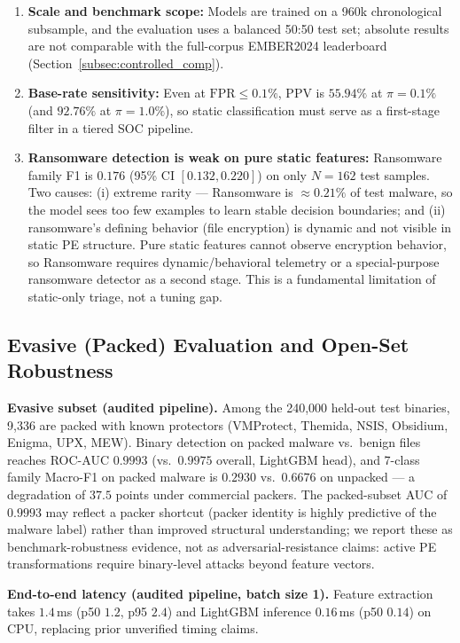 \documentclass[Number]{sn-jnl}
\begin{document}
\begin{enumerate}[leftmargin=*]
\item \textbf{Scale and benchmark scope:} Models are trained on a 960k chronological subsample, and the evaluation uses a balanced 50:50 test set; absolute results are not comparable with the full-corpus EMBER2024 leaderboard (Section~\ref{subsec:controlled_comp}).

\item \textbf{Base-rate sensitivity:} Even at $\text{FPR}\le0.1\%$, PPV is $55.94\%$ at $\pi=0.1\%$ (and $92.76\%$ at $\pi=1.0\%$), so static classification must serve as a first-stage filter in a tiered SOC pipeline.

\item \textbf{Ransomware detection is weak on pure static features:} Ransomware family F1 is $0.176$ (95\% CI $[0.132, 0.220]$) on only $N=162$ test samples. Two causes: (i) extreme rarity --- Ransomware is $\approx0.21\%$ of test malware, so the model sees too few examples to learn stable decision boundaries; and (ii) ransomware's defining behavior (file encryption) is dynamic and not visible in static PE structure. Pure static features cannot observe encryption behavior, so Ransomware requires dynamic/behavioral telemetry or a special-purpose ransomware detector as a second stage. This is a fundamental limitation of static-only triage, not a tuning gap.
\end{enumerate}

\subsection*{Evasive (Packed) Evaluation and Open-Set Robustness}

\noindent\textbf{Evasive subset (audited pipeline).}
Among the 240,000 held-out test binaries, 9,336 are packed with known protectors (VMProtect, Themida, NSIS, Obsidium, Enigma, UPX, MEW). Binary detection on packed malware vs.\ benign files reaches ROC-AUC $0.9993$ (vs.\ $0.9975$ overall, LightGBM head), and 7-class family Macro-F1 on packed malware is $0.2930$ vs.\ $0.6676$ on unpacked --- a degradation of $37.5$ points under commercial packers. The packed-subset AUC of $0.9993$ may reflect a packer shortcut (packer identity is highly predictive of the malware label) rather than improved structural understanding; we report these as benchmark-robustness evidence, not as adversarial-resistance claims: active PE transformations require binary-level attacks beyond feature vectors.

\noindent\textbf{End-to-end latency (audited pipeline, batch size 1).}
Feature extraction takes $1.4$\,ms (p50 $1.2$, p95 $2.4$) and LightGBM inference $0.16$\,ms (p50 $0.14$) on CPU, replacing prior unverified timing claims.
\end{document}
